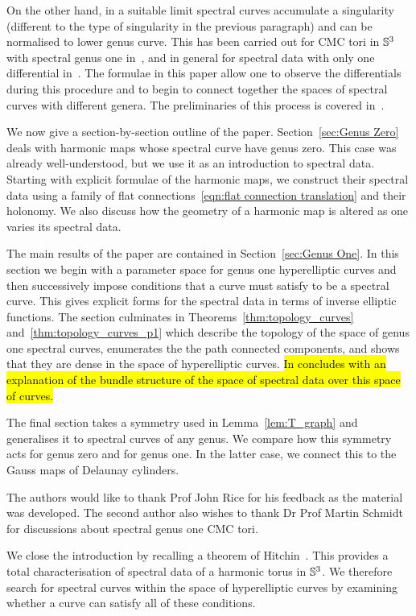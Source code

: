 \documentclass{article}
\begin{document}
On the other hand, in a suitable limit spectral curves accumulate a singularity (different to the type of singularity in the previous paragraph) and can be normalised to lower genus curve. This has been carried out for CMC tori in $\S^3$ with spectral genus one in~\cite{Kilian2015}, and in general for spectral data with only one differential in~\cite{Hauswirth2017arxiv}. The formulae in this paper allow one to observe the differentials during this procedure and to begin to connect together the spaces of spectral curves with different genera. The preliminaries of this process is covered in~\cite[Section~4.2]{Ogilvie2017}. 

We now give a section-by-section outline of the paper. Section~\ref{sec:Genus Zero} deals with harmonic maps whose spectral curve have genus zero. This case was already well-understood, but we use it as an introduction to spectral data. Starting with explicit formulae of the harmonic maps, we construct their spectral data using a family of flat connections~\eqref{eqn:flat connection translation} and their holonomy.
We also discuss how the geometry of a harmonic map is altered as one varies its spectral data.

The main results of the paper are contained in Section~\ref{sec:Genus One}. In this section we begin with a parameter space for genus one hyperelliptic curves and then successively impose conditions that a curve must satisfy to be a spectral curve. This gives explicit forms for the spectral data in terms of inverse elliptic functions.
The section culminates in Theorems~\ref{thm:topology_curves} and~\ref{thm:topology_curves_p1} which describe the topology of the space of genus one spectral curves, enumerates the the path connected components, and shows that they are dense in the space of hyperelliptic curves. \hl{In concludes with an explanation of the bundle structure of the space of spectral data over this space of curves.}

The final section takes a symmetry used in Lemma~\ref{lem:T_graph} and generalises it to spectral curves of any genus. We compare how this symmetry acts for genus zero and for genus one. In the latter case, we connect this to the Gauss maps of Delaunay cylinders.

The authors would like to thank Prof John Rice for his feedback as the material was developed. The second author also wishes to thank Dr Prof Martin Schmidt for discussions about spectral genus one CMC tori.

We close the introduction by recalling a theorem of Hitchin~\cite[Theorem~8.1]{Hitchin1990}. This provides a total characterisation of spectral data of a harmonic torus in $\S^3$. We therefore search for spectral curves within the space of hyperelliptic curves by examining whether a curve can satisfy all of these conditions.
\end{document}
